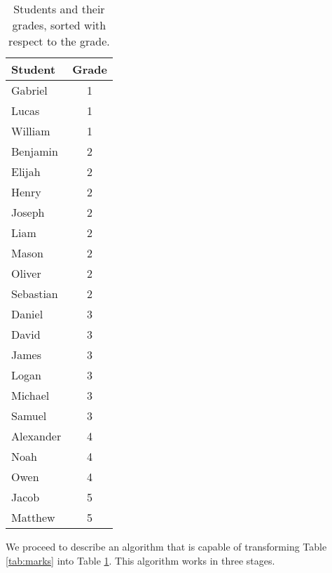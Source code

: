 \begin{table}[!ht]
  \centering
  \begin{tabular}{|l|c|}
    \hline
    Student   & Grade \\
    \hline
    \hline
    Gabriel   & 1 \\
    \hline
    Lucas     & 1 \\
    \hline
    William   & 1 \\
    \hline
    Benjamin  & 2 \\
    \hline
    Elijah    & 2 \\
    \hline
    Henry     & 2 \\
    \hline
    Joseph    & 2 \\
    \hline
    Liam      & 2 \\
    \hline
    Mason     & 2 \\
    \hline
    Oliver    & 2 \\
    \hline
    Sebastian & 2 \\
    \hline
    Daniel    & 3 \\
    \hline
    David     & 3 \\
    \hline
    James     & 3 \\
    \hline
    Logan     & 3 \\
    \hline
    Michael   & 3 \\
    \hline
    Samuel    & 3 \\
    \hline
    Alexander & 4 \\
    \hline
    Noah      & 4 \\
    \hline
    Owen      & 4 \\
    \hline
    Jacob     & 5 \\
    \hline
    Matthew   & 5 \\
    \hline
  \end{tabular}
  \caption{Students and their grades, sorted with respect to the grade.}
  \label{tab:marks-sorted}
\end{table}
We proceed to describe an algorithm that is capable of transforming Table \ref{tab:marks} into Table
\ref{tab:marks-sorted}.  This algorithm works in three stages.
